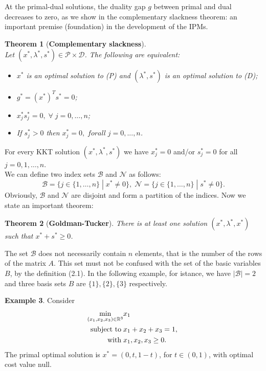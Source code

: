 \documentclass[a4paper,10 pt,titlepage,twoside]{book}
\theoremstyle{plain}
\newtheorem{thm}{Theorem}[chapter]
\theoremstyle{definition}
\newtheorem{ex}[thm]{Example}
\theoremstyle{remark}
\begin{document}
At the primal-dual solutions, the duality gap $g$ between primal and dual decreases to zero, as we show in the complementary slackness theorem: an important premise (foundation) in the development of the IPMs.
\begin{thm}[\textbf{Complementary slackness}] \ \\
	Let $(x^{*},\lambda^{*},s^{*})\in\mathcal{P}\times\mathcal{D}$. The following are equivalent:
	\begin{itemize}
		\item $x^{*}$ is an optimal solution to (P) and $(\lambda^{*},s^{*})$ is an optimal solution to (D);
		\item $g^{*} = (x^{*})^{T}s^{*}=0$;
		\item $x^{*}_{j}s^{*}_{j}=0,\;\forall\; j=0,...,n$;
		\item If $s^{*}_{j} > 0$ then $x^{*}_{j}= 0,\;for all\; j=0,...,n$.
	\end{itemize}
\end{thm}

For every KKT solution $(x^{*}, \lambda^{*}, s^{*})$ we have $x_{j}^{*}= 0$ and/or $s_{j}^{*}= 0$ for all $j=0,1,\dots,n$.\\
We can define two index sets $\mathcal{B}$ and $\mathcal{N}$ as follows:
\begin{equation}\label{index}
\mathcal{B} =\{j\in\{1,\dots,n\}\;|\; x^{*} \not= 0\}, \;
\mathcal{N} =\{j\in\{1,\dots,n\}\;|\; s^{*} \not= 0\}.
\end{equation}  
Obviously, $\mathcal{B}$ and $\mathcal{N}$ are disjoint and form a partition of the indices. Now we state an important theorem:
\begin{thm}[\textbf{Goldman-Tucker}]
	There is at least one solution $(x^{*}, \lambda^{*}, x^{*})$ such that $x^{*}+s^{*}\geq0$.
\end{thm}
The set $\mathcal{B}$ does not necessarily contain $n$ elements, that is the number of the rows of the matrix $A$. This set must not be confused with the set of the basic variables $B$, by the definition (2.1). In the following example, for istance, we have $|\mathcal{B}|= 2$ and three basis sets $B$ are $\{1\}, \{2\}, \{3\}$ respectively.
\begin{ex}
Consider
\begin{align*} \min\limits_{(x_{1},x_{2},x_{3})\in\mathbb{R}^{3}} &x_{1}\\ \text{\;subject to\;} &x_{1}+x_{2}+x_{3} = 1,\; \\
 \text{\; with\;} &x_{1}, x_{2}, x_{3} \geq 0.
 \end{align*}
The primal optimal solution is $x^{*}=(0, t, 1-t)$, for $t\in(0,1)$, with optimal cost value null. 	
\end{ex} 
\end{document}
